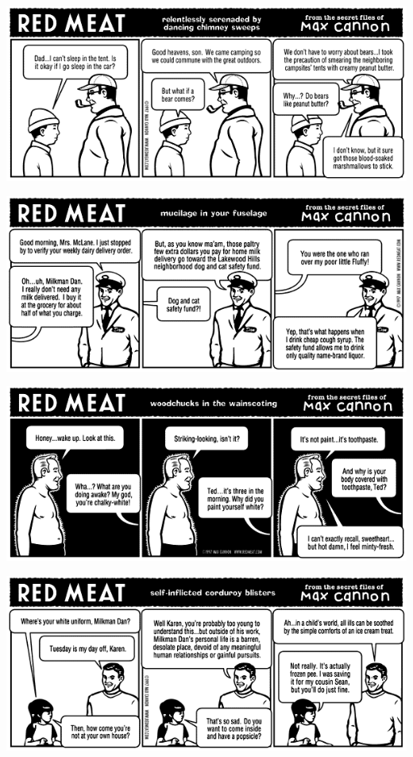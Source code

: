 \documentclass[a4paper,twoside,11pt]{article}
\begin{document}
\includegraphics[width=\textwidth]{redmeat_1998-02-16.png}



\includegraphics[width=\textwidth]{redmeat_1998-02-23.png}



\includegraphics[width=\textwidth]{redmeat_1998-03-02.png}



\includegraphics[width=\textwidth]{redmeat_1998-03-09.png}
\end{document}
